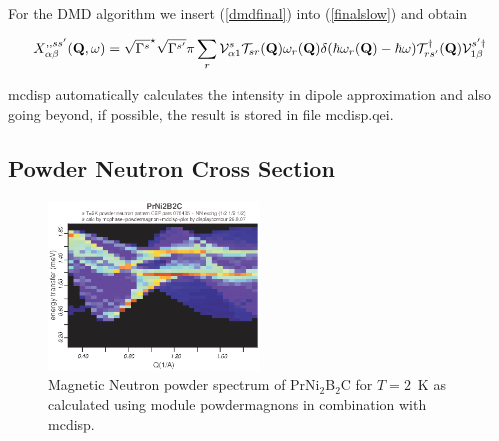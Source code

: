 For the DMD algorithm we insert  (\ref{dmdfinal}) into (\ref{finalslow}) and obtain


\begin{equation}\label{Xcalc}
X^{,,ss'}_{\alpha\beta}(\mbf Q,\omega)=\sqrt{\Gamma^s}^\star\sqrt{\Gamma^{s'}} 
\pi \sum_r 
 \mathcal V^s_{\alpha1} \mathcal T_{sr}(\mbf Q)\omega_r(\mbf Q) \delta(\hbar \omega_r(\mbf Q) %
- \hbar \omega) \mathcal T^{\dag}_{rs'}(\mbf Q)  \mathcal V^{s'\dag}_{1\beta}
\end{equation}




{\prg mcdisp} automatically calculates the intensity in
dipole approximation and also going beyond, if possible, the result
is stored in file {\prg mcdisp.qei}.

\subsection{Powder Neutron Cross Section}


\begin{figure}[tb]%
\begin{center}\leavevmode
\includegraphics[angle=0, width=0.5\textwidth]{figsrc/contour2K_070504.eps}
\end{center}
\caption{Magnetic Neutron powder spectrum of PrNi$_2$B$_2$C for $T=2$~K as calculated using module {\prg powdermagnons} %
in combination with {\prg 
mcdisp}.}\label{prni2b2c_2K}
\end{figure}

